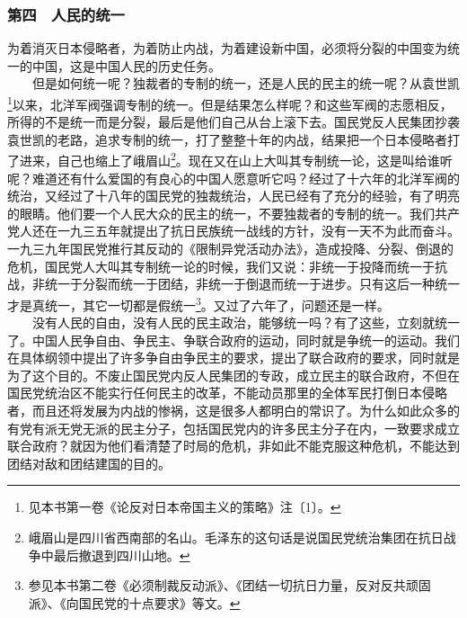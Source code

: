 \documentclass[cn,11pt,chinese]{elegantbook}
\def\myformat#1{\hfil\hfil #1}
\begin{document}
\subsubsection*{\myformat{第四　人民的统一}}
为着消灭日本侵略者，为着防止内战，为着建设新中国，必须将分裂的中国变为统一的中国，这是中国人民的历史任务。\\
　　但是如何统一呢？独裁者的专制的统一，还是人民的民主的统一呢？从袁世凯\footnote[17]{  见本书第一卷《论反对日本帝国主义的策略》注〔1〕。}以来，北洋军阀强调专制的统一。但是结果怎么样呢？和这些军阀的志愿相反，所得的不是统一而是分裂，最后是他们自己从台上滚下去。国民党反人民集团抄袭袁世凯的老路，追求专制的统一，打了整整十年的内战，结果把一个日本侵略者打了进来，自己也缩上了峨眉山\footnote[18]{  峨眉山是四川省西南部的名山。毛泽东的这句话是说国民党统治集团在抗日战争中最后撤退到四川山地。}。现在又在山上大叫其专制统一论，这是叫给谁听呢？难道还有什么爱国的有良心的中国人愿意听它吗？经过了十六年的北洋军阀的统治，又经过了十八年的国民党的独裁统治，人民已经有了充分的经验，有了明亮的眼睛。他们要一个人民大众的民主的统一，不要独裁者的专制的统一。我们共产党人还在一九三五年就提出了抗日民族统一战线的方针，没有一天不为此而奋斗。一九三九年国民党推行其反动的《限制异党活动办法》，造成投降、分裂、倒退的危机，国民党人大叫其专制统一论的时候，我们又说：非统一于投降而统一于抗战，非统一于分裂而统一于团结，非统一于倒退而统一于进步。只有这后一种统一才是真统一，其它一切都是假统一\footnote[19]{  参见本书第二卷《必须制裁反动派》、《团结一切抗日力量，反对反共顽固派》、《向国民党的十点要求》等文。}。又过了六年了，问题还是一样。\\
　　没有人民的自由，没有人民的民主政治，能够统一吗？有了这些，立刻就统一了。中国人民争自由、争民主、争联合政府的运动，同时就是争统一的运动。我们在具体纲领中提出了许多争自由争民主的要求，提出了联合政府的要求，同时就是为了这个目的。不废止国民党内反人民集团的专政，成立民主的联合政府，不但在国民党统治区不能实行任何民主的改革，不能动员那里的全体军民打倒日本侵略者，而且还将发展为内战的惨祸，这是很多人都明白的常识了。为什么如此众多的有党有派无党无派的民主分子，包括国民党内的许多民主分子在内，一致要求成立联合政府？就因为他们看清楚了时局的危机，非如此不能克服这种危机，不能达到团结对敌和团结建国的目的。\\
\end{document}

